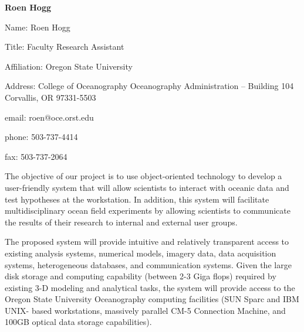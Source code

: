 \begin{center}
\LARGE
{\bf  Roen Hogg}
\end{center}
\large
{}
\normalsize
\smallskip
\begin{description}
\item{Name:}  Roen Hogg
\item{Title:}  Faculty Research Assistant
\item{Affiliation:}  Oregon State University
\item{Address:}
		College of Oceanography
		Oceanography Administration -- Building 104
		Corvallis, OR  97331-5503
\item{email:}  roen@oce.orst.edu
\item{phone:}  503-737-4414
\item{fax:}  503-737-2064
\end{description}

\medskip
\large
{}
\normalsize
\medskip

	The objective of our project is to use object-oriented technology to 
develop a user-friendly system that will allow scientists to interact with 
oceanic data and test hypotheses at the workstation.  In addition, this 
system will facilitate multidisciplinary ocean field experiments by 
allowing scientists to communicate the results of their research to 
internal and external user groups.

	The proposed system will provide intuitive and relatively 
transparent access to existing analysis systems, numerical models, 
imagery data, data acquisition systems, heterogeneous databases, and 
communication systems.  Given the large disk storage and computing 
capability (between 2-3 Giga flops) required by existing 3-D modeling and 
analytical tasks, the system will provide access to the Oregon State 
University Oceanography computing facilities (SUN Sparc and IBM UNIX-
based workstations, massively parallel CM-5 Connection Machine, and 
100GB optical data storage capabilities).

